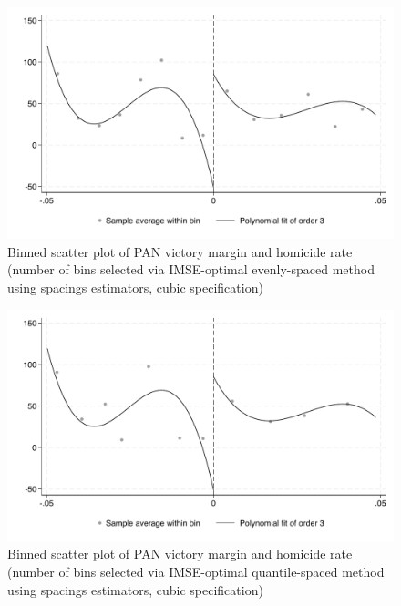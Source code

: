\documentclass{article}
\begin{document}
\begin{figure}[H]
    \centering
    \includegraphics[scale=0.5]{../outputs/binned_scatter_es_cubic_plot.pdf}
    \caption{Binned scatter plot of PAN victory margin and homicide rate (number of bins selected via IMSE-optimal evenly-spaced method using spacings estimators, cubic specification)}
    \label{fig:binned_scatter_es_cubic}
\end{figure}

\begin{figure}[H]
    \centering
    \includegraphics[scale=0.5]{../outputs/binned_scatter_qs_cubic_plot.pdf}
    \caption{Binned scatter plot of PAN victory margin and homicide rate (number of bins selected via IMSE-optimal quantile-spaced method using spacings estimators, cubic specification)}
    \label{fig:binned_scatter_qs_cubic}
\end{figure}
\end{document}
